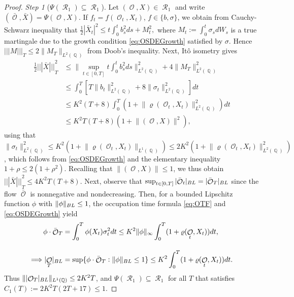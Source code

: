 \documentclass[11pt]{article}
\newcommand{\vertiii}[1]{{| \! | \! | #1 | \!
    | \! |}}
\theoremstyle{plain}
\theoremstyle{definition}
\DeclareMathOperator{\Q}{\mathbb{Q}}
\DeclareMathOperator{\calO}{\mathcal{O}}
\DeclareMathOperator{\calR}{\mathcal{R}}
\begin{document}
\begin{proof}
\noindent
\textit{Step 1} ($\Psi(\calR_1)\subseteq \calR_1$).
Let $(\calO,X)\in \calR_1$ and  write 
$(\bar{\calO},\bar{X}) = \Psi(\calO,X)$. If 
$f_t = f(\calO_t,X_t)$, $f\in \{b,\sigma\}$, 
we obtain from Cauchy-Schwarz inequality that 
$
    \frac{1}{2}|\bar{X}_t|^2  
    \le t \int_0^t b_s^2ds + M_t^2, 
  $
where  $M_t := \int_0^t \sigma_s dW_s$ is a  true martingale due to the growth condition \eqref{eq:OSDEGrowth} satisfied by $\sigma$.  
Hence    $\vertiii{M}_T\le 2 \lVert M_T\rVert_{L^2(\Q)}$ from  Doob's inequality. Next, Itô isometry  gives 
\begin{align*}
    \frac{1}{2}\vertiii{\bar{X}}_T^2 
    &\le \big  \lVert \sup_{t\in [0,T]} t\int_0^t  b_s^2 ds \big \rVert_{L^2(\Q)}^2 + 4 \lVert M_T\rVert_{L^2(\Q)}^2 \\[0.75em] 
      &\le   \int_0^T \left[T\lVert b_t \rVert_{L^2(\Q)}^2 + 8 \lVert \sigma_t\rVert_{L^2(\Q)}^2\right]dt 
      \\[0.75em] 
     &\le  K^2(T+8)\int_0^T (1+\lVert \varrho(\calO_t,X_t) \rVert_{L^2(\Q)}^2)dt \\[0.75em] 
      &\le    K^2T(T+8)(1 +  \lVert(\calO,X)\rVert^2), 
\end{align*}
using that $\lVert \sigma_t\rVert_{L^2(\Q)}^2 \le K^2 (1+\lVert \varrho(\calO_t,X_t) \rVert_{L^1(\Q)}) \le 2K^2(1+\lVert \varrho(\calO_t,X_t) \rVert_{L^2(\Q)}^2)$, which follows from  \eqref{eq:OSDEGrowth} and the elementary inequality $1+\rho \le 2(1+\rho^2)$. 
Recalling that  $\lVert(\calO,X)\rVert\le 1$, we thus obtain $\vertiii{\bar{X}}_T^2 \le 4K^2T(T+8)$. 
Next, observe that     $\sup_{t\in [0,T]}|\bar{\calO}_t|_{\textnormal{\tiny{BL}}}  = |\bar{\calO}_T|_{\textnormal{\tiny{BL}}} $ since the flow $\bar{\calO}$ is  nonnegative and nondecreasing.   
Then, for a bounded Lipschitz function $\phi$ with $\lVert \phi\rVert_{\textnormal{\tiny{BL}}}\le 1$,  the occupation time formula \eqref{eq:OTF} and \eqref{eq:OSDEGrowth} yield %
   \begin{align*}
       \phi\cdot \bar{\calO}_T 
   &=   \int_0^T \phi(X_t) \sigma_t^2 dt \le K^2\lVert \phi\rVert_{\infty} \int_0^T (1+ \varrho(\calO_t,X_t))dt,\\[1em]
   \Longrightarrow |\! \calO_T\! |_{\textnormal{\tiny{BL}}}  &= \sup\{\phi\cdot \bar{\calO}_T : \lVert \phi \rVert_{\textnormal{\tiny{BL}}} \le 1\}\le  K^2\int_0^T (1+ \varrho(\calO_t,X_t))dt. %
   \end{align*}
Thus $\lVert|\! \calO_T\! |_{\textnormal{\tiny{BL}}}\rVert_{L^1(\Q)}\le 2K^2 T$,  %
and
$\Psi(\calR_1)\subseteq \calR_1$ for all $T$ that satisfies  $C_1(T):= 2K^2T(2T+17)\le 1$. 


\end{proof}
\end{document}
